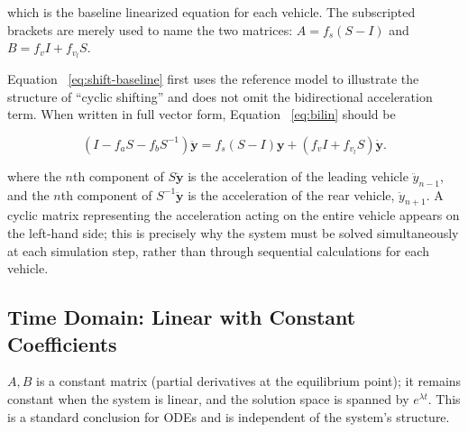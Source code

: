 \documentclass[11pt,a4paper,openany]{book}
\numberwithin{equation}{chapter}
\numberwithin{figure}{chapter}
\numberwithin{table}{chapter}
\begin{document}
which is the baseline linearized equation for each vehicle. The subscripted brackets are merely used to name the two matrices: $A=f_s(S-I)$ and $B=f_vI+f_{v_l}S$.










\begin{tcolorbox}[notebox,title=\textbf{Why hasn’t Equation ~\eqref{eq:shift-baseline} yet included $f_a$ and $f_b$? }]

Equation ~\eqref{eq:shift-baseline} first uses the reference model to illustrate the structure of “cyclic shifting” and does not omit the bidirectional acceleration term. When written in full vector form, Equation ~\eqref{eq:bilin} should be

\begin{equation}
\left(I-f_aS-f_bS^{-1}\right)\ddot{\mathbf y}
=f_s(S-I)\mathbf y+\left(f_vI+f_{v_l}S\right)\dot{\mathbf y}.
\label{eq:bilin-shift}
\end{equation}

where the $n$th component of $S\ddot{\mathbf y}$ is the acceleration of the leading vehicle $\ddot y_{n-1}$, and the $n$th component of $S^{-1}\ddot{\mathbf y}$ is the acceleration of the rear vehicle, $\ddot y_{n+1}$. A cyclic matrix representing the acceleration acting on the entire vehicle appears on the left-hand side; this is precisely why the system must be solved simultaneously at each simulation step, rather than through sequential calculations for each vehicle.


\end{tcolorbox}

\subsection{Time Domain: Linear with Constant Coefficients}










$A,B$ is a constant matrix (partial derivatives at the equilibrium point); it remains constant when the system is linear, and the solution space is spanned by $e^{\lambda t}$. This is a standard conclusion for ODEs and is independent of the system’s structure.
\end{document}
